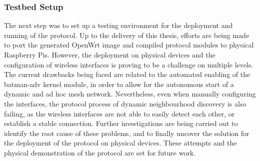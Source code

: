 \subsubsection{Testbed Setup} \label{sec:infrastructure:testbed}


The next step was to set up a testing environment for the deployment and running of the \pol{} protocol. Up to the delivery of this thesis, efforts are being made to port the generated OpenWrt image and compiled protocol modules to physical Raspberry Pis. However, the deployment on physical devices and the configuration of wireless interfaces is proving to be a challenge on multiple levels. The current drawbacks being faced are related to the automated enabling of the batman-adv kernel module, in order to allow for the autonomous start of a dynamic and ad hoc mesh network. Nevertheless, even when manually configuring the interfaces, the protocol process of dynamic neighbourhood discovery is also failing, as the wireless interfaces are not able to easily detect each other, or establish a stable connection. Further investigations are being carried out to identify the root cause of these problems, and to finally uncover the solution for the deployment of the protocol on physical devices. These attempts and the physical demonstration of the \pol{} protocol are set for future work.

